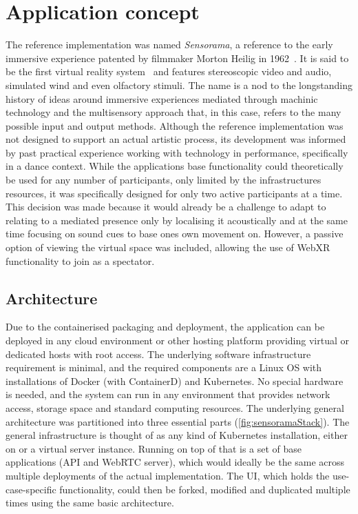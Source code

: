 \chapter{Application concept}
\label{ch:concept}

The reference implementation was named \emph{Sensorama}, a reference to the early immersive experience patented by filmmaker Morton Heilig in 1962~\parencite{Heilig_1962}.
It is said to be the first virtual reality system~\parencite[5][]{vrHistoryGigante} and features stereoscopic video and audio, simulated wind and even olfactory stimuli.
The name is a nod to the longstanding history of ideas around immersive experiences mediated through machinic technology and the multisensory approach that, in this case, refers to the many possible input and output methods.
Although the reference implementation was not designed to support an actual artistic process, its development was informed by past practical experience working with technology in performance, specifically in a dance context.
While the application\textquotesingle s base functionality could theoretically be used for any number of participants, only limited by the infrastructure\textquotesingle s resources, it was specifically designed for only two active participants at a time.
This decision was made because it would already be a challenge to adapt to relating to a mediated presence only by localising it acoustically and at the same time focusing on sound cues to base one\textquotesingle s own movement on.
However, a passive option of viewing the virtual space was included, allowing the use of \ac{WebXR} functionality to join as a spectator.

\section{Architecture}
\label{sec:architecture}

Due to the containerised packaging and deployment, the application can be deployed in any cloud environment or other hosting platform providing virtual or dedicated hosts with root access.
The underlying software infrastructure requirement is minimal, and the required components are a Linux \ac{OS} with installations of Docker (with ContainerD) and Kubernetes.
No special hardware is needed, and the system can run in any environment that provides network access, storage space and standard computing resources.
The underlying general architecture was partitioned into three essential parts (\autoref{fig:sensoramaStack}).
The general infrastructure is thought of as any kind of Kubernetes installation, either on  or a virtual server instance.
Running on top of that is a set of base applications (\ac{API} and \ac{WebRTC} server), which would ideally be the same across multiple deployments of the actual implementation.
The \ac{UI}, which holds the use-case-specific functionality, could then be forked, modified and duplicated multiple times using the same basic architecture.

